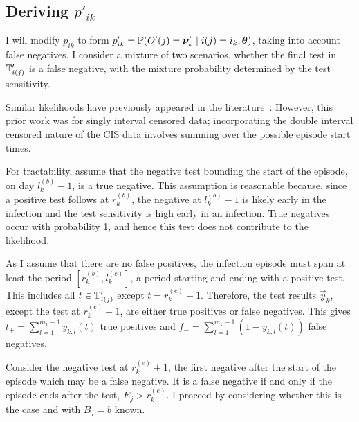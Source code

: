 \documentclass[thesis.tex]{subfiles}
\begin{document}
\subsection{Deriving $p'_{ik}$} \label{imperf-test:sec:modifying-p_ia}

I will modify $p_{ik}$ to form $p_{ik}' = \operatorname{\mathbb{P}}(O'(j) = \bm{\nu}'_k \mid i(j) = i_k, \bm{\theta})$, taking into account false negatives.
I consider a mixture of two scenarios, whether the final test in $\mathbb{T}'_{i(j)}$ is a false negative, with the mixture probability determined by the test sensitivity.

Similar likelihoods have previously appeared in the literature~\autocite[e.g.][eq.\ (2)]{piresIntervalMisclassify}.
However, this prior work was for singly interval censored data; incorporating the double interval censored nature of the CIS data involves summing over the possible episode start times.


For tractability, assume that the negative test bounding the start of the episode, on day $l_k^{(b)}-1$, is a true negative.
This assumption is reasonable because, since a positive test follows at $r_k^{(b)}$, the negative at $l_k^{(b)}-1$ is likely early in the infection and the test sensitivity is high early in an infection.
True negatives occur with probability 1, and hence this test does not contribute to the likelihood.

As I assume that there are no false positives, the infection episode must span at least the period $[r^{(b)}_k, l^{(e)}_k]$, a period starting and ending with a positive test.
This includes all $t \in \mathbb{T}'_{i(j)}$ except $t = r_k^{(e)}+1$.
Therefore, the test results $\vec{y}_k$, except the test at $r_k^{(e)}+1$, are either true positives or false negatives.
This gives $t_+ = \sum_{l=1}^{m_k-1} y_{k,l}(t)$ true positives and $f_- = \sum_{l=1}^{m_k-1} (1 - y_{k,l}(t))$ false negatives.

Consider the negative test at $r_k^{(e)}+1$, the first negative after the start of the episode which may be a false negative.
It is a false negative if and only if the episode ends after the test, \ie $E_j > r_k^{(e)}$.
I proceed by considering whether this is the case and with $B_j = b$ known.
\end{document}
